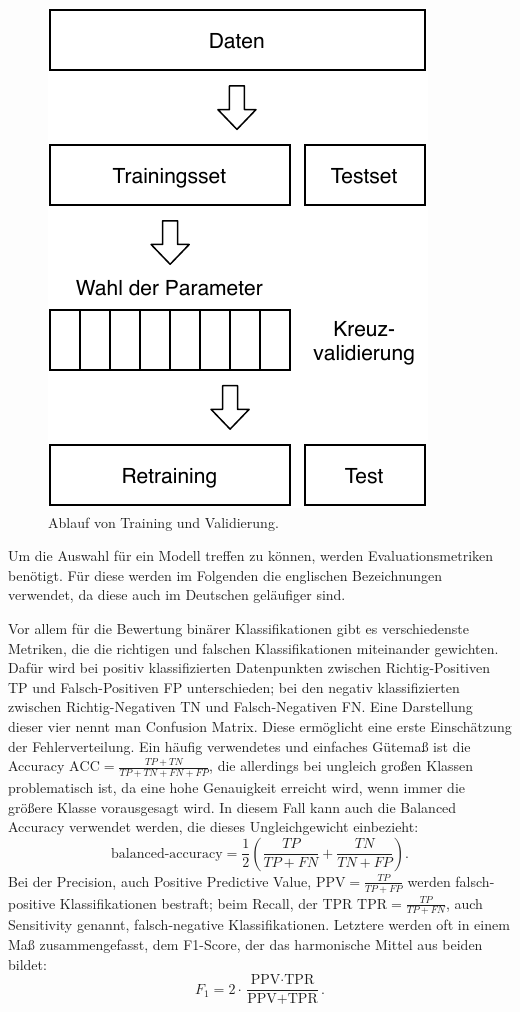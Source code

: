 	\begin{figure}[H]
		\centering
		\includegraphics[scale=0.95]{pic/validation-ablauf.pdf}
		\caption{Ablauf von Training und Validierung.}
		\label{fig:validation-ablauf}
	\end{figure}
	
	Um die Auswahl für ein Modell treffen zu können, werden Evaluationsmetriken benötigt. Für diese werden im Folgenden die englischen Bezeichnungen verwendet, da diese auch im Deutschen geläufiger sind.
	
	Vor allem für die Bewertung binärer Klassifikationen gibt es verschiedenste Metriken, die die richtigen und falschen Klassifikationen miteinander gewichten. Dafür wird bei positiv klassifizierten Datenpunkten zwischen Richtig-Positiven TP und Falsch-Positiven FP unterschieden; bei den negativ klassifizierten zwischen Richtig-Negativen TN und Falsch-Negativen FN. Eine Darstellung dieser vier nennt man Confusion Matrix. Diese ermöglicht eine erste Einschätzung der Fehlerverteilung. Ein häufig verwendetes und einfaches Gütemaß ist die Accuracy $\text{ACC} = \frac{TP + TN}{TP + TN + FN + FP}$, die allerdings bei ungleich großen Klassen problematisch ist, da eine hohe Genauigkeit erreicht wird, wenn immer die größere Klasse vorausgesagt wird. In diesem Fall kann auch die Balanced Accuracy verwendet werden, die dieses Ungleichgewicht einbezieht:
	\[
		\text{balanced-accuracy} = \frac{1}{2}\left( \frac{TP}{TP + FN} + \frac{TN}{TN + FP}\right).
	\]
	 Bei der Precision, auch Positive Predictive Value, $\text{PPV} = \frac{TP}{TP + FP}$ werden falsch-positive Klassifikationen \glqq bestraft\grqq{}; beim Recall, der \acl{TPR} $\text{TPR} = \frac{TP}{TP + FN}$, auch Sensitivity genannt, falsch-negative Klassifikationen. Letztere werden oft in einem Maß zusammengefasst, dem F1-Score, der das harmonische Mittel aus beiden bildet:
	\[
		F_1 = 2 \cdot \frac{\text{PPV} \cdot \text{TPR}}{\text{PPV} + \text{TPR}}.
	\]
	
